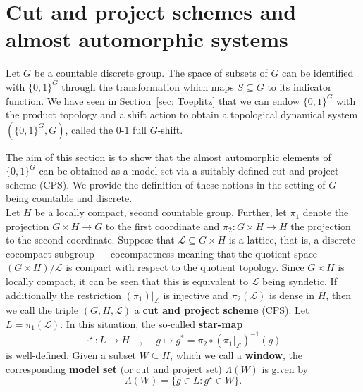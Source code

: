 \documentclass[titlepage,reqno,10pt]{amsart}
\theoremstyle{definition}
\newcommand{\tm}{\subseteq}
\begin{document}
\section{Cut and project schemes and almost automorphic systems} \label{sect: CPS}

Let $G$ be a countable discrete group. The space of subsets of $G$ can be identified with $\{0,1\}^G$ through the transformation which maps $S\tm G$ to its indicator function.
We have seen in Section~\ref{sec: Toeplitz} that we can endow $\{0,1\}^G$ with the product topology and a shift action to obtain a topological dynamical system $(\{0,1\}^G,G)$, called the $0$-$1$ full $G$-shift.

The aim of this section is to show that the almost automorphic elements of $\{0,1\}^G$ can  be obtained as a model set via a suitably defined cut and project scheme (CPS). We provide the definition of these notions in the setting of $G$ being countable and discrete.\\

Let $H$ be a locally compact, second countable group. Further, let $\pi_1$ denote the projection $G\times H \to G$ to the first coordinate and $\pi_2:G\times H \to H$ the projection to the second coordinate. 
Suppose that $\mathcal{L}\subseteq G\times H$ is a lattice, that is, a discrete cocompact subgroup --- 
cocompactness meaning that the quotient space $(G\times H)/\mathcal{L}$ is compact with respect to the quotient topology. 
Since $G\times H$ is locally compact, it can be seen that this is equivalent to $\mathcal{L}$ being syndetic.
If additionally the restriction $(\pi_1)\vert_\mathcal{L}$ is injective and $\pi_2(\mathcal{L})$ is dense in $H$, then we call the triple $(G,H,\mathcal{L})$ a \textbf{cut and project scheme} (CPS).
Let $L = \pi_1(\mathcal{L})$.
In this situation, the so-called \textbf{star-map} $$\cdot^\star: L\to H\quad , \quad \: g \mapsto g^*=\pi_2\circ (\pi_1\vert_\mathcal{L})^{-1}(g)$$ is well-defined.  
Given a subset $W\subseteq H$, which we call a \textbf{window}, the corresponding \textbf{model set} (or cut and project set) $\Lambda(W)$ is given by
$$ \Lambda(W) = \{g \in L:g^\star \in W\}. $$
\end{document}
